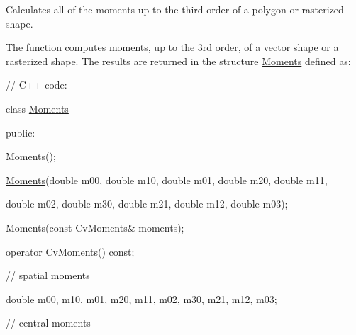 Calculates all of the moments up to the third order of a polygon or rasterized shape.

The function computes moments, up to the 3rd order, of a vector shape or a rasterized shape. The results are returned in the structure {\ttfamily \mbox{\hyperlink{classorg_1_1opencv_1_1imgproc_1_1_moments}{Moments}}} defined as\+: {\ttfamily }

{\ttfamily }

{\ttfamily }

{\ttfamily // C++ code\+:}

{\ttfamily }

{\ttfamily }

{\ttfamily class \mbox{\hyperlink{classorg_1_1opencv_1_1imgproc_1_1_moments}{Moments}}}

{\ttfamily }

{\ttfamily }

{\ttfamily public\+:}

{\ttfamily }

{\ttfamily }

{\ttfamily Moments();}

{\ttfamily }

{\ttfamily }

{\ttfamily \mbox{\hyperlink{classorg_1_1opencv_1_1imgproc_1_1_moments}{Moments}}(double m00, double m10, double m01, double m20, double m11,}

{\ttfamily }

{\ttfamily }

{\ttfamily double m02, double m30, double m21, double m12, double m03);}

{\ttfamily }

{\ttfamily }

{\ttfamily Moments(const Cv\+Moments\& moments);}

{\ttfamily }

{\ttfamily }

{\ttfamily operator Cv\+Moments() const;}

{\ttfamily }

{\ttfamily }

{\ttfamily // spatial moments}

{\ttfamily }

{\ttfamily }

{\ttfamily double m00, m10, m01, m20, m11, m02, m30, m21, m12, m03;}

{\ttfamily }

{\ttfamily }

{\ttfamily // central moments}

